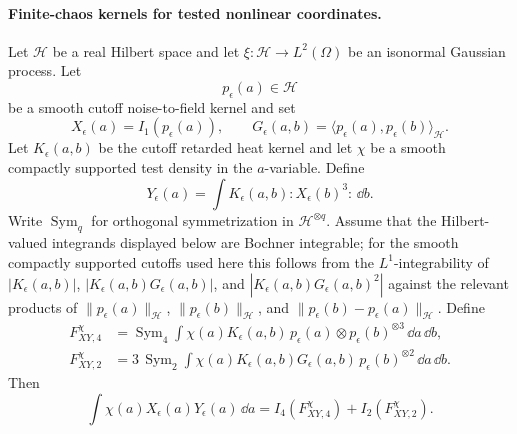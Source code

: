 \paragraph{Finite-chaos kernels for tested nonlinear coordinates.}
Let \(\mathcal H\) be a real Hilbert space and let
\(\xi:\mathcal H\to L^2(\Omega)\) be an isonormal Gaussian process.  Let
\[
  p_\epsilon(a)\in\mathcal H
\]
be a smooth cutoff noise-to-field kernel and set
\[
  X_\epsilon(a)=I_1(p_\epsilon(a)),\qquad
  G_\epsilon(a,b)=\langle p_\epsilon(a),p_\epsilon(b)\rangle_{\mathcal H}.
\]
Let \(K_\epsilon(a,b)\) be the cutoff retarded heat kernel and let
\(\chi\) be a smooth compactly supported test density in the \(a\)-variable.
Define
\[
  Y_\epsilon(a)
  =
  \int K_\epsilon(a,b):X_\epsilon(b)^3:\,\dd b .
\]
Write \(\operatorname{Sym}_q\) for orthogonal symmetrization in
\(\mathcal H^{\otimes q}\).  Assume that the Hilbert-valued integrands
displayed below are Bochner integrable; for the smooth compactly supported
cutoffs used here this follows from the \(L^1\)-integrability of
\(|K_\epsilon(a,b)|\), \(|K_\epsilon(a,b)G_\epsilon(a,b)|\), and
\(|K_\epsilon(a,b)G_\epsilon(a,b)^2|\) against the relevant products of
\(\|p_\epsilon(a)\|_{\mathcal H}\), \(\|p_\epsilon(b)\|_{\mathcal H}\), and
\(\|p_\epsilon(b)-p_\epsilon(a)\|_{\mathcal H}\).  Define
\begin{equation}
\begin{aligned}
  F_{XY,4}^{\chi}
  &=
  \operatorname{Sym}_4
  \int\chi(a)K_\epsilon(a,b)\,
  p_\epsilon(a)\otimes p_\epsilon(b)^{\otimes3}\,\dd a\,\dd b,\\
  F_{XY,2}^{\chi}
  &=
  3\,\operatorname{Sym}_2
  \int\chi(a)K_\epsilon(a,b)G_\epsilon(a,b)\,
  p_\epsilon(b)^{\otimes2}\,\dd a\,\dd b .
\end{aligned}
  \label{eq:spde-xy-tested-chaos-kernels}
\end{equation}
Then
\begin{equation}
  \int\chi(a)X_\epsilon(a)Y_\epsilon(a)\,\dd a
  =
  I_4(F_{XY,4}^{\chi})+I_2(F_{XY,2}^{\chi}).
  \label{eq:spde-xy-tested-chaos-expansion}
\end{equation}

